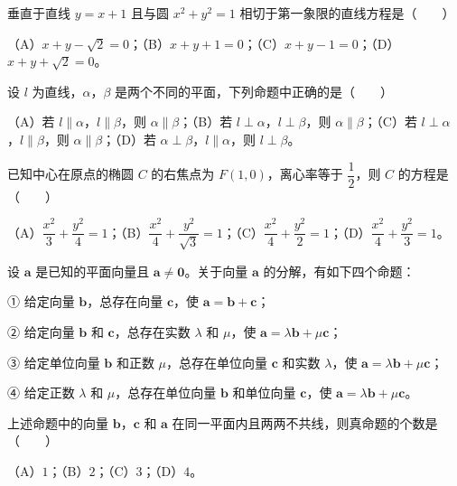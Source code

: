 \begin{question}
垂直于直线 $y=x+1$ 且与圆 $x^2+y^2=1$ 相切于第一象限的直线方程是\mbox{（　　）}

（A）$x+y-\sqrt2=0$；（B）$x+y+1=0$；（C）$x+y-1=0$；（D）$x+y+\sqrt2=0$。

\end{question}
\begin{question}
设 $l$ 为直线，$\alpha$，$\beta$ 是两个不同的平面，下列命题中正确的是\mbox{（　　）}

（A）若 $l\parallel\alpha$，$l\parallel\beta$，则 $\alpha\parallel\beta$；（B）若 $l\perp\alpha$，$l\perp\beta$，则 $\alpha\parallel\beta$；（C）若 $l\perp\alpha$，$l\parallel\beta$，则 $\alpha\parallel\beta$；（D）若 $\alpha\perp\beta$，$l\parallel\alpha$，则 $l\perp\beta$。

\end{question}
\begin{question}
已知中心在原点的椭圆 $C$ 的右焦点为 $F(1,0)$，离心率等于 $\dfrac12$，则 $C$ 的方程是\mbox{（　　）}

（A）$\dfrac{x^2}3+\dfrac{y^2}4=1$；（B）$\dfrac{x^2}4+\dfrac{y^2}{\sqrt3}=1$；（C）$\dfrac{x^2}4+\dfrac{y^2}2=1$；（D）$\dfrac{x^2}4+\dfrac{y^2}3=1$。

\end{question}
\begin{question}
设 $\boldsymbol a$ 是已知的平面向量且 $\boldsymbol a\neq\boldsymbol 0$。关于向量 $\boldsymbol a$ 的分解，有如下四个命题：

① 给定向量 $\boldsymbol b$，总存在向量 $\boldsymbol c$，使 $\boldsymbol a=\boldsymbol b+\boldsymbol c$；

② 给定向量 $\boldsymbol b$ 和 $\boldsymbol c$，总存在实数 $\lambda$ 和 $\mu$，使 $\boldsymbol a=\lambda\boldsymbol b+\mu\boldsymbol c$；

③ 给定单位向量 $\boldsymbol b$ 和正数 $\mu$，总存在单位向量 $\boldsymbol c$ 和实数 $\lambda$，使 $\boldsymbol a=\lambda\boldsymbol b+\mu\boldsymbol c$；

④ 给定正数 $\lambda$ 和 $\mu$，总存在单位向量 $\boldsymbol b$ 和单位向量 $\boldsymbol c$，使 $\boldsymbol a=\lambda\boldsymbol b+\mu\boldsymbol c$。

上述命题中的向量 $\boldsymbol b$，$\boldsymbol c$ 和 $\boldsymbol a$ 在同一平面内且两两不共线，则真命题的个数是\mbox{（　　）}

（A）$1$；（B）$2$；（C）$3$；（D）$4$。

\end{question}

